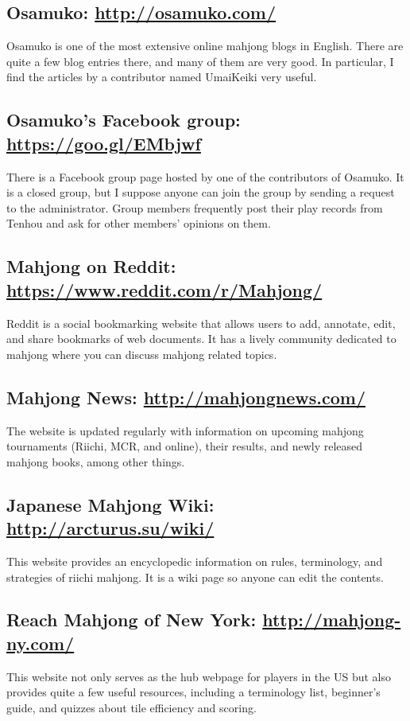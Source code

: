 \subsection*{Osamuko: \url{http://osamuko.com/}} 
Osamuko is one of the most extensive online mahjong blogs in English. There are quite a few blog entries there, and many of them are very good. In particular, I find the articles by a contributor named UmaiKeiki very useful.

\subsection*{Osamuko's Facebook group: \url{https://goo.gl/EMbjwf}}
There is a Facebook group page hosted by one of the contributors of Osamuko. It is a closed group, but I suppose anyone can join the group by sending a request to the administrator. Group members frequently post their play records from {\jap Tenhou} and ask for other members' opinions on them.

\subsection*{Mahjong on Reddit: \url{https://www.reddit.com/r/Mahjong/}}
Reddit is a social bookmarking website that allows users to add, annotate, edit, and share bookmarks of web documents. It has a lively community dedicated to mahjong where you can discuss mahjong related topics.

\subsection*{Mahjong News: \url{http://mahjongnews.com/}}
The website is updated regularly with information on upcoming mahjong tournaments (Riichi, MCR, and online), their results, and newly released mahjong books, among other things.

\subsection*{Japanese Mahjong Wiki: \url{http://arcturus.su/wiki/}}
This website provides an encyclopedic information on rules, terminology, and strategies of riichi mahjong. It is a wiki page so anyone can edit the contents.

\subsection*{Reach Mahjong of New York: \url{http://mahjong-ny.com/}}
This website not only serves as the hub webpage for players in the US but also provides quite a few useful resources, including a terminology list, beginner's guide, and quizzes about tile efficiency and scoring.

